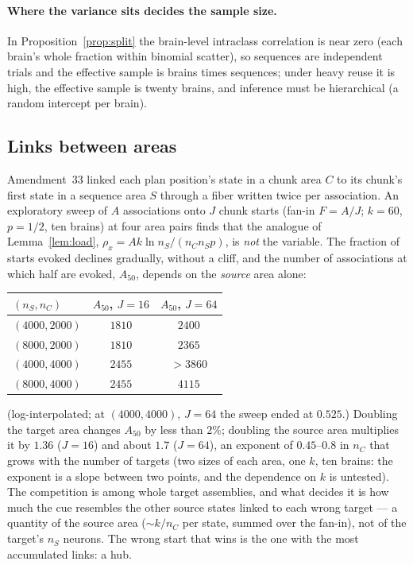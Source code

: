 \documentclass[11pt]{article}
\theoremstyle{definition}
\theoremstyle{plain}
\begin{document}
\paragraph{Where the variance sits decides the sample size.} In
Proposition~\ref{prop:split} the brain-level intraclass correlation is near zero
(each brain's whole fraction within binomial scatter), so sequences are
independent trials and the effective sample is brains times sequences; under
heavy reuse it is high, the effective sample is twenty brains, and inference
must be hierarchical (a random intercept per brain).

\subsection{Links between areas}

Amendment~33 linked each plan position's state in a chunk area $C$ to its
chunk's first state in a sequence area $S$ through a fiber written twice per
association. An exploratory sweep of $A$ associations onto $J$ chunk starts
(fan-in $F = A/J$; $k = 60$, $p = 1/2$, ten brains) at four area pairs finds
that the analogue of Lemma~\ref{lem:load}, $\rho_x = Ak\ln n_S/(n_Cn_Sp)$, is
\emph{not} the variable. The fraction of starts evoked declines gradually,
without a cliff, and the number of associations at which half are evoked,
$A_{50}$, depends on the \emph{source} area alone:

\begin{center}
\begin{tabular}{lcc}
\toprule
$(n_S, n_C)$ & $A_{50}$, $J = 16$ & $A_{50}$, $J = 64$ \\
\midrule
$(4000, 2000)$ & $1810$ & $2400$ \\
$(8000, 2000)$ & $1810$ & $2365$ \\
$(4000, 4000)$ & $2455$ & $> 3860$ \\
$(8000, 4000)$ & $2455$ & $4115$ \\
\bottomrule
\end{tabular}
\end{center}

\noindent (log-interpolated; at $(4000,4000)$, $J = 64$ the sweep ended at
$0.525$.) Doubling the target area changes $A_{50}$ by less than $2\%$; doubling
the source area multiplies it by $1.36$ ($J = 16$) and about $1.7$ ($J = 64$), an
exponent of $0.45$--$0.8$ in $n_C$ that grows with the number of targets
(two sizes of each area, one $k$, ten brains: the exponent is a slope between
two points, and the dependence on $k$ is untested). The
competition is among whole target assemblies, and what decides it is how much
the cue resembles the other source states linked to each wrong target --- a
quantity of the source area ($\sim k/n_C$ per state, summed over the fan-in),
not of the target's $n_S$ neurons. The wrong start that wins is the one with
the most accumulated links: a hub.
\end{document}
